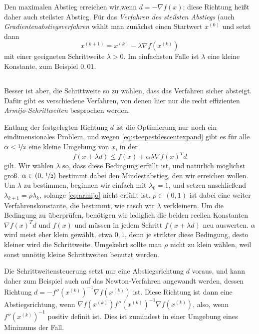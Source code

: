 Den maximalen Abstieg erreichen wir,wenn $d = -\nabla f(x)$; diese
Richtung heißt daher auch steilster Abstieg. Für das \emph{Verfahren
  des steilsten Abstiegs} (auch \emph{Gradientenabstiegsverfahren}
wählt man zunächst einen Startwert $x^{(0)}$ und setzt dann
\begin{equation}
  \label{eq:steepestdescent}
  x^{(k+1)} = x^{(k)} - \lambda \nabla f\left(x^{(k)}\right)
\end{equation}
mit einer geeigneten Schrittweite $\lambda>0$. Im einfachsten Falle
ist $\lambda$ eine kleine Konstante, zum Beispiel $0,01$.

\subsection{}

Besser ist aber, die Schrittweite so zu wählen, dass das Verfahren
sicher absteigt. Dafür gibt es verschiedene Verfahren, von denen hier
nur die recht effizienten \emph{Armijo-Schrittweiten} besprochen
werden.

Entlang der festgelegten Richtung $d$ ist die Optimierung nur noch ein
eindimensionales Problem, und wegen \eqref{eq:steepestdescentexpand}
gibt es für alle $\alpha<\nicefrac{1}{2}$ eine kleine Umgebung von
$x$, in der
\begin{equation}
  \label{eq:armijo}
  f(x + \lambda d) \le f(x) + \alpha\lambda \nabla f(x)^Td
\end{equation}
gilt. Wir wählen $\lambda$ so, dass diese Bedingung erfüllt ist, und
natürlich möglichst groß. $\alpha\in(0,\,\nicefrac{1}{2})$ bestimmt
dabei den Mindestabstieg, den wir erreichen wollen. Um $\lambda$ zu
bestimmen, beginnen wir einfach mit $\lambda_0=1$, und setzen
anschließend $\lambda_{k+1} = \rho\lambda_{k}$, solange
\eqref{eq:armijo} nicht erfüllt ist. $\rho\in (0,1)$ ist dabei eine
weiter Verfahrenskonstante, die bestimmt, wie rasch wir $\lambda$
verkleinern. Um die Bedingung zu überprüfen, benötigen wir lediglich
die beiden reellen Konstanten $\nabla f(x)^Td$ und $f(x)$ und müssen
in jedem Schritt $f(x + \lambda d)$ neu auswerten.  $\alpha$ wird
meist eher klein gewählt, etwa $0,1$, denn je strikter diese
Bedingung, desto kleiner wird die Schrittweite. Umgekehrt sollte man
$\rho$ nicht zu klein wählen, weil sonst unnötig kleine
Schrittweiten benutzt werden.

Die Schrittweitensteuerung setzt nur eine Abstiegsrichtung $d$ voraus,
und kann daher zum Beispiel auch auf das Newton-Verfahren angewandt
werden, dessen Richtung $d=-f''\left(x^{(k)}\right)^{-1}\nabla
f\left(x^{(k)}\right)$ ist. Diese Richtung ist dann eine
Abstiegsrichtung, wenn $\nabla f\left(x^{(k)}\right)
f''\left(x^{(k)}\right)^{-1} \nabla f\left(x^{(k)}\right)$, also, wenn
$f''\left(x^{(k)}\right)^{-1}$ positiv definit ist. Dies ist zumindest
in einer Umgebung eines Minimums der Fall.

